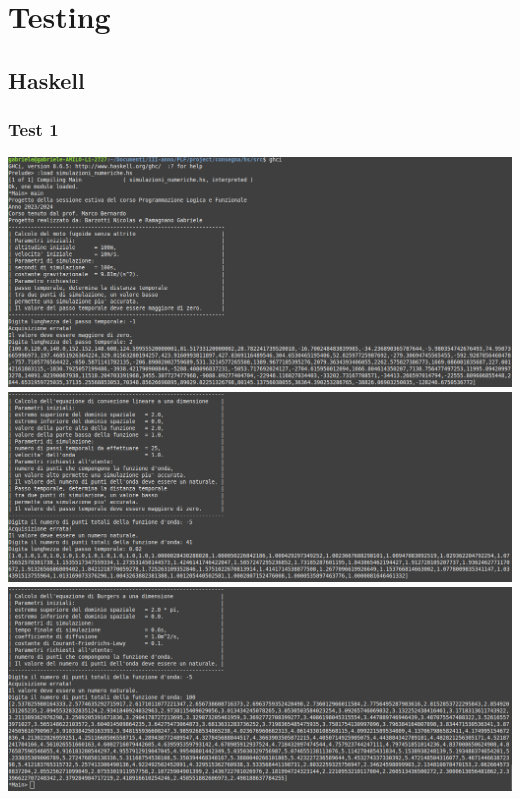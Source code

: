 \section{Testing}

\subsection{Haskell}

\subsubsection*{Test 1}
\includegraphics[width=\textwidth,height=\textheight,keepaspectratio]{05_testing/image/hs/01_test/01_negativo.png}
\\
\includegraphics[width=\textwidth,height=\textheight,keepaspectratio]{05_testing/image/hs/01_test/03_negativo.png}
\\
\includegraphics[width=\textwidth,height=\textheight,keepaspectratio]{05_testing/image/hs/01_test/04_negativo.png}

